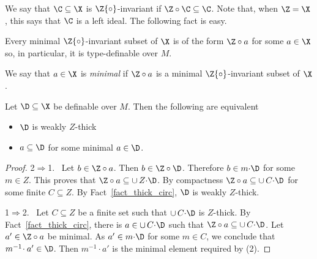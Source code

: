 We say that $\C\subseteq\X$ is $\Z{\circ}$-invariant if $\Z\circ\C\subseteq\C$.
Note that, when $\Z=\X$, this says that $\C$ is a left ideal.
The following fact is easy.

\begin{fact}
  Every minimal $\Z{\circ}$-invariant subset of $\X$ is of the form $\Z\circ a$ for some $a\in\X$ so, in particular, it is type-definable over $M$.
\end{fact}

We say that $a\in\X$ is \emph{minimal\/} if $\Z\circ a$ is a minimal $\Z{\circ}$-invariant subset of $\X$.

\begin{theorem}
  Let $\D\subseteq\X$ be definable over $M$.
  Then the following are equivalent
  \begin{itemize}
    \item [1.] $\D$ is weakly $Z$-thick
    \item [2.] $a\subseteq\D$ for some minimal $a\in\D$.
  \end{itemize}
\end{theorem}

\begin{proof}
  2$\Rightarrow$1. \ 
  Let $b\in\Z\circ a$.
  Then $b\in\Z\circ\D$.
  Therefore $b\in m{\cdot}\D$ for some $m\in Z$.
  This proves that $\Z\circ a\subseteq\cup\,Z{\cdot}\D$.
  By compactness $\Z\circ a\subseteq\cup\,C{\cdot}\D$ for some finite $C\subseteq Z$.
  By Fact~\ref{fact_thick_circ}, $\D$ is weakly $Z$-thick.

  1$\Rightarrow$2. \ 
  Let $C\subseteq Z$ be a finite set such that $\cup\,C{\cdot}\D$ is $Z$-thick.
  By Fact~\ref{fact_thick_circ}, there is $a\in\cup\,C{\cdot}\D$ such that $\Z\circ a\subseteq\cup\,C{\cdot}\D$.
  Let $a'\in\Z\circ a$ be minimal.
  As $a'\in m{\cdot}\D$ for some $m\in C$, we conclude that $m^{-1}\!\cdot a'\in\D$.
  Then $m^{-1}\!\cdot a'$ is the minimal element required by (2).
\end{proof}




